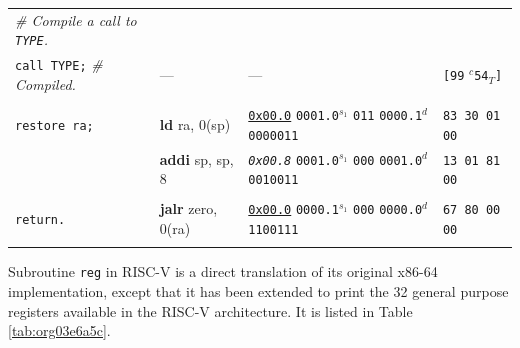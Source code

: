 \documentclass[a4paper,12pt,final]{article}
\begin{document}
\begin{table}[!htbp]
\begin{adjustwidth}{-1cm}{-1cm}
\begin{center}
\begin{tabular}{l|ll|l}
\emph{\# Compile a call to \texttt{TYPE}.} &  &  & \\[0pt]
\texttt{call TYPE;}  \emph{\# Compiled.} & --- & --- & \texttt{[99} \(^{c}\)​\texttt{54}​\(_{T}\)​\texttt{]}\\[0pt]
 &  &  & \\[0pt]
\texttt{restore ra;} & \textbf{ld} ra, 0(sp) & \uline{\texttt{0x00.0}}                    \texttt{0001.0}​\(^{s_{1}}\) \texttt{011} \texttt{0000.1}​\(^{d}\)  \texttt{0000011} & \texttt{83 30 01 00}\\[0pt]
 & \textbf{addi} sp, sp, 8 & \emph{\texttt{0x00.8}}                    \texttt{0001.0}​\(^{s_{1}}\) \texttt{000} \texttt{0001.0}​\(^{d}\)  \texttt{0010011} & \texttt{13 01 81 00}\\[0pt]
 &  &  & \\[0pt]
\texttt{return.} & \textbf{jalr} zero, 0(ra) & \uline{\texttt{0x00.0}}                    \texttt{0000.1}​\(^{s_{1}}\) \texttt{000} \texttt{0000.0}​\(^{d}\)  \texttt{1100111} & \texttt{67 80 00 00}\\[0pt]
 &  &  & \\[0pt]
\end{tabular}

\end{center}
\normalsize \end{adjustwidth} \end{table} \vspace{0}

Subroutine \texttt{reg} in RISC-V is a direct translation of its original
x86-64 implementation, except that it has been extended to print the
32 general purpose registers available in the RISC-V architecture.  It
is listed in Table \ref{tab:org03e6a5c}.
\end{document}
